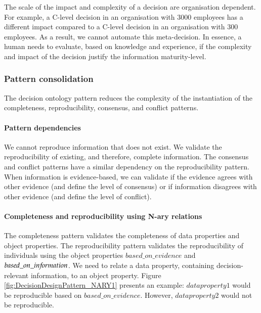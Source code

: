 The scale of the impact and complexity of a decision are organisation dependent. For example, a C-level decision in an organisation with 3000 employees has a different impact compared to a C-level decision in an organisation with 300 employees. As a result, we cannot automate this meta-decision. In essence, a human needs to evaluate, based on knowledge and experience, if the complexity and impact of the decision justify the information maturity-level.

 
 
 
 

\subsubsection{Pattern consolidation}
The decision ontology pattern reduces the complexity of the instantiation of the completeness, reproducibility, consensus, and conflict patterns.

\paragraph{Pattern dependencies}
We cannot reproduce information that does not exist. We validate the reproducibility of existing, and therefore, complete information. The consensus and conflict patterns have a similar dependency on the reproducibility pattern. When information is evidence-based, we can validate if the evidence agrees with other evidence (and define the level of consensus) or if information disagrees with other evidence (and define the level of conflict). 

\begin{center}
\large\color{document}{There is no consensus or conflict without reproducibility. There is no reproducibility without completeness.} 
\end{center}

\paragraph{Completeness and reproducibility using N-ary relations}
The completeness pattern validates the completeness of data properties and object properties. The reproducibility pattern validates the reproducibility of individuals using the object properties $based\_on\_evidence$ and $based\_on\_in{\mkern-2mu f\mkern-3mu}ormation$. We need to relate a data property, containing decision-relevant information, to an object property. Figure \ref{fig:DecisionDesignPattern_NARY1} presents an example: $dataproperty1$ would be reproducible based on $based\_on\_evidence$. However, $dataproperty2$ would not be reproducible.

